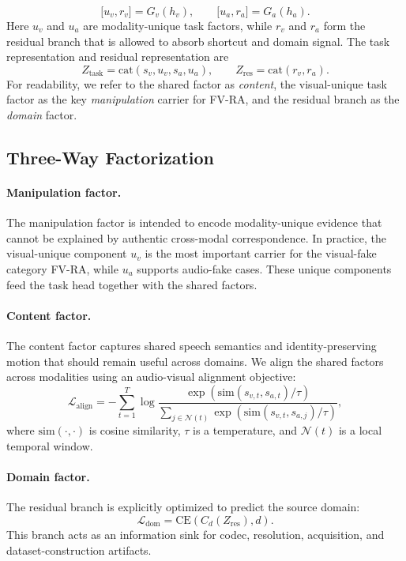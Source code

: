 \documentclass{article}
\begin{document}
\begin{equation}
\big[u_v, r_v\big] = G_v(h_v), \qquad \big[u_a, r_a\big] = G_a(h_a).
\end{equation}
Here $u_v$ and $u_a$ are modality-unique task factors, while $r_v$ and $r_a$ form the residual branch that is allowed to absorb shortcut and domain signal. The task representation and residual representation are
\begin{equation}
Z_{\mathrm{task}} = \mathrm{cat}(s_v, u_v, s_a, u_a), \qquad
Z_{\mathrm{res}} = \mathrm{cat}(r_v, r_a).
\end{equation}
For readability, we refer to the shared factor as \emph{content}, the visual-unique task factor as the key \emph{manipulation} carrier for FV-RA, and the residual branch as the \emph{domain} factor.

\subsection{Three-Way Factorization}

\paragraph{Manipulation factor.}
The manipulation factor is intended to encode modality-unique evidence that cannot be explained by authentic cross-modal correspondence. In practice, the visual-unique component $u_v$ is the most important carrier for the visual-fake category FV-RA, while $u_a$ supports audio-fake cases. These unique components feed the task head together with the shared factors.

\paragraph{Content factor.}
The content factor captures shared speech semantics and identity-preserving motion that should remain useful across domains. We align the shared factors across modalities using an audio-visual alignment objective:
\begin{equation}
\mathcal{L}_{\mathrm{align}} = - \sum_{t=1}^T
\log
\frac{\exp(\mathrm{sim}(s_{v,t}, s_{a,t})/\tau)}
{\sum_{j \in \mathcal{N}(t)} \exp(\mathrm{sim}(s_{v,t}, s_{a,j})/\tau)},
\end{equation}
where $\mathrm{sim}(\cdot,\cdot)$ is cosine similarity, $\tau$ is a temperature, and $\mathcal{N}(t)$ is a local temporal window.

\paragraph{Domain factor.}
The residual branch is explicitly optimized to predict the source domain:
\begin{equation}
\mathcal{L}_{\mathrm{dom}} = \mathrm{CE}(C_d(Z_{\mathrm{res}}), d).
\end{equation}
This branch acts as an information sink for codec, resolution, acquisition, and dataset-construction artifacts.
\end{document}
